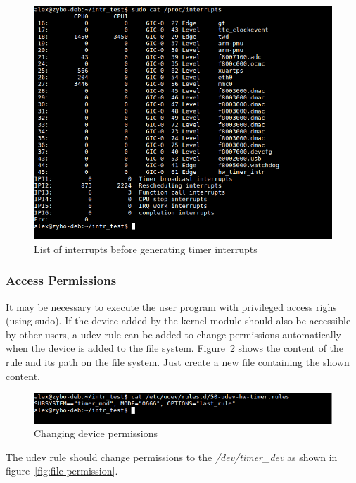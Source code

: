 \begin{figure}[ht]
    \centering
    \includegraphics[width=1.0\textwidth,height=1.0\textheight,keepaspectratio]{figures/interrupt_entry.png}
    \caption{List of interrupts before generating timer interrupts}
    \label{fig:generated-interrupt}
\end{figure}

\subsubsection{Access Permissions}
It may be necessary to execute the user program with privileged access righs (using sudo).
If the device added by the kernel module should also be accessible by other users, a udev rule can be added to change permissions automatically when the device is added to the file system.
Figure~\ref{fig:udev-rule} shows the content of the rule and its path on the file system.
Just create a new file containing the shown content.

\begin{figure}[ht]
    \centering
    \includegraphics[width=1.0\textwidth,height=1.0\textheight,keepaspectratio]{figures/udev_rule.png}
    \caption{Changing device permissions}
    \label{fig:udev-rule}
\end{figure}

The udev rule should change permissions to the \emph{/dev/timer\_dev} as shown in figure~\ref{fig:file-permission}.

